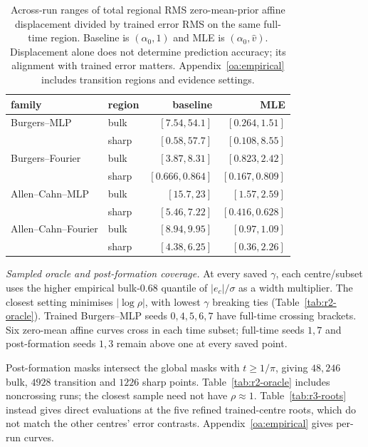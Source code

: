 \begin{table}[t]
\centering\small\setlength{\tabcolsep}{4pt}

\begin{tabular}{@{}llrr@{}}
\toprule
family & region & baseline & MLE \\
\midrule
Burgers--MLP & bulk & $[7.54,54.1]$ & $[0.264,1.51]$ \\
 & sharp & $[0.58,57.7]$ & $[0.108,8.55]$ \\
Burgers--Fourier & bulk & $[3.87,8.31]$ & $[0.823,2.42]$ \\
 & sharp & $[0.666,0.864]$ & $[0.167,0.809]$ \\
Allen--Cahn--MLP & bulk & $[15.7,23]$ & $[1.57,2.59]$ \\
 & sharp & $[5.46,7.22]$ & $[0.416,0.628]$ \\
Allen--Cahn--Fourier & bulk & $[8.94,9.95]$ & $[0.97,1.09]$ \\
 & sharp & $[4.38,6.25]$ & $[0.36,2.26]$ \\
\bottomrule
\end{tabular}
\caption{Across-run ranges of total regional RMS zero-mean-prior affine displacement divided by trained
error RMS on the same full-time region. Baseline is $(\alpha_0,1)$ and MLE is
$(\alpha_0,\widehat v)$. Displacement alone does not determine prediction accuracy;
its alignment with trained error matters. Appendix~\ref{oa:empirical} includes transition
regions and evidence settings.}
\label{tab:r2-relative-shift}
\end{table}

\emph{Sampled oracle and post-formation coverage.}
At every saved $\gamma$, each centre/subset uses the higher empirical bulk-$0.68$
quantile of $|e_c|/\sigma$ as a width multiplier. The closest setting minimises
$|\log\rho|$, with lowest $\gamma$ breaking ties (Table~\ref{tab:r2-oracle}).
Trained Burgers--MLP seeds $0,4,5,6,7$ have full-time crossing brackets.
Six zero-mean affine curves cross in each time subset; full-time seeds $1,7$ and
post-formation seeds $1,3$ remain above one at every saved point.



Post-formation masks intersect the global masks with $t\ge1/\pi$, giving
$48{,}246$ bulk, $4928$ transition and $1226$ sharp points. Table~\ref{tab:r2-oracle}
includes noncrossing runs; the closest sample need not have $\rho\approx1$.
Table~\ref{tab:r3-roots} instead gives direct evaluations at the five refined
trained-centre roots, which do not match the other centres' error contrasts.
Appendix~\ref{oa:empirical} gives per-run curves.

